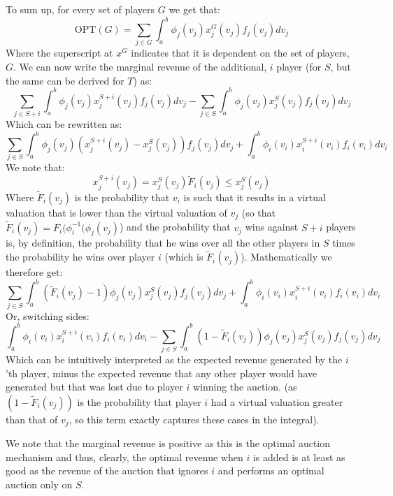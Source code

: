 \documentclass[a4page,notitlepage]{article}
\begin{document}
\begin{enumerate}
  To sum up, for every set of players $G$ we get that:
  \begin{equation*}
    \text{OPT}(G)=\sum_{j\in G}\int_a^b\phi_j(v_j)x_j^G(v_j)f_j(v_j)dv_j
  \end{equation*}
  Where the superscript at $x^G$ indicates that it is dependent on the set of players, $G$.
  We can now write the marginal revenue of the additional, $i$ player (for $S$, but the same can be derived for $T$) as:
  \begin{equation*}
    \sum_{j\in S+{i}}\int_a^b\phi_j(v_j)x_j^{S+{i}}(v_j)f_j(v_j)dv_j-\sum_{j\in S}\int_a^b\phi_j(v_j)x_j^S(v_j)f_j(v_j)dv_j 
  \end{equation*}
  Which can be rewritten as:
  \begin{equation*}
    \sum_{j\in S}\int_a^b\phi_j(v_j)(x_j^{S+{i}}(v_j)-x_j^S(v_j))f_j(v_j)dv_j + \int_a^b\phi_i(v_i)x_i^{S+{i}}(v_i)f_i(v_i)dv_i
  \end{equation*}
  We note that:
  \begin{equation*}
    x_j^{S+i}(v_j)=x_j^S(v_j)\tilde F_i(v_j)\leq x_j^S(v_j)
  \end{equation*}
  Where $\tilde F_i(v_j)$ is the probability that $v_i$ is such that it results in a virtual valuation that is lower than the virtual valuation of $v_j$ (so that $\tilde{F}_i(v_j)=F_i(\phi_i^{-1}(\phi_j(v_j)$) and the probability that $v_j$ wins against $S+i$ players is, by definition, the probability that he wins over all the other players in $S$ times the probability he wins over player $i$ (which is $\tilde F_i(v_j)$).
  Mathematically we therefore get:
  \begin{equation*}
    \sum_{j\in S}\int_a^b(\tilde{F}_i(v_j)-1)\phi_j(v_j)x_j^S(v_j)f_j(v_j)dv_j + \int_a^b\phi_i(v_i)x_i^{S+{i}}(v_i)f_i(v_i)dv_i
  \end{equation*}
  Or, switching sides:
  \begin{equation*}
     \int_a^b\phi_i(v_i)x_i^{S+{i}}(v_i)f_i(v_i)dv_i-\sum_{j\in S}\int_a^b(1-\tilde{F}_i(v_j))\phi_j(v_j)x_j^S(v_j)f_j(v_j)dv_j
  \end{equation*}
  Which can be intuitively interpreted as the expected revenue generated by the $i$'th player, minus the expected revenue that any other player would have generated but that was lost due to player $i$ winning the auction.
(as $(1-\tilde{F}_i(v_j))$ is the probability that player $i$ had a virtual valuation greater than that of $v_j$, so this term exactly captures these cases in the integral).

  We note that the marginal revenue is positive as this is the optimal auction mechanism and thus, clearly, the optimal revenue when $i$ is added is at least as good as the revenue of the auction that ignores $i$ and performs an optimal auction only on $S$.


\end{enumerate}
\end{document}

